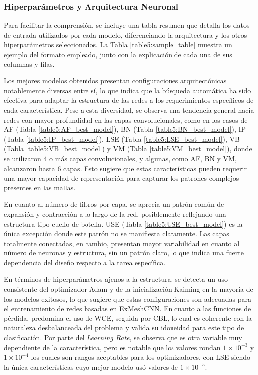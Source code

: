 \subsubsection{Hiperparámetros y Arquitectura Neuronal}
Para facilitar la comprensión, se incluye una tabla resumen que detalla los datos de entrada utilizados por cada modelo, diferenciando la arquitectura y los otros hiperparámetros seleccionados. La Tabla \ref{table5:sample_table} muestra un ejemplo del formato empleado, junto con la explicación de cada una de sus columnas y filas.

Los mejores modelos obtenidos presentan configuraciones arquitectónicas notablemente diversas entre sí, lo que indica que la búsqueda automática ha sido efectiva para adaptar la estructura de las redes a los requerimientos específicos de cada característica. Pese a esta diversidad, se observa una tendencia general hacia redes con mayor profundidad en las capas convolucionales, como en los casos de AF (Tabla \ref{table5:AF_best_model}), BN (Tabla \ref{table5:BN_best_model}), IP (Tabla \ref{table5:IP_best_model}), LSE (Tabla \ref{table5:LSE_best_model}), VB (Tabla \ref{table5:VB_best_model}) y VM (Tabla \ref{table5:VM_best_model}), donde se utilizaron 4 o más capas convolucionales, y algunas, como AF, BN y VM, alcanzaron hasta 6 capas. Esto sugiere que estas características pueden requerir una mayor capacidad de representación para capturar los patrones complejos presentes en las mallas.

En cuanto al número de filtros por capa, se aprecia un patrón común de expansión y contracción a lo largo de la red, posiblemente reflejando una estructura tipo cuello de botella. USE (Tabla \ref{table5:USE_best_model}) es la única excepción donde este patrón no se manifiesta claramente. Las capas totalmente conectadas, en cambio, presentan mayor variabilidad en cuanto al número de neuronas y estructura, sin un patrón claro, lo que indica una fuerte dependencia del diseño respecto a la tarea específica.

En términos de hiperparámetros ajenos a la estructura, se detecta un uso consistente del optimizador Adam y de la inicialización Kaiming en la mayoría de los modelos exitosos, lo que sugiere que estas configuraciones son adecuadas para el entrenamiento de redes basadas en ExMeshCNN. En cuanto a las funciones de pérdida, predomina el uso de WCE, seguida por CBL, lo cual es coherente con la naturaleza desbalanceada del problema y valida su idoneidad para este tipo de clasificación. Por parte del \textit{Learning Rate}, se observa que es otra variable muy dependiente de la característica, pero es notable que los valores rondan $1\times10^{-3}$ y $1\times10^{-4}$ los cuales son rangos aceptables para los optimizadores, con LSE siendo la única características cuyo mejor modelo usó valores de $1\times10^{-5}$. 

